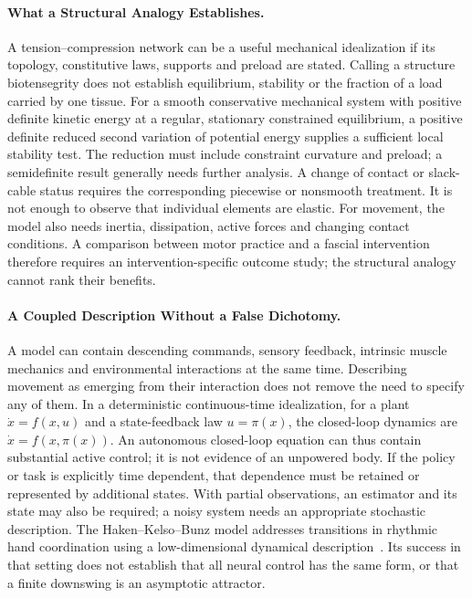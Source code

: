 
\paragraph{What a Structural Analogy Establishes.}
A tension--compression network can be a useful mechanical idealization if its topology, constitutive laws, supports and preload are stated.
Calling a structure biotensegrity does not establish equilibrium, stability or the fraction of a load carried by one tissue.
For a smooth conservative mechanical system with positive definite kinetic energy at a regular, stationary constrained equilibrium, a positive definite reduced second variation of potential energy supplies a sufficient local stability test.
The reduction must include constraint curvature and preload; a semidefinite result generally needs further analysis.
A change of contact or slack-cable status requires the corresponding piecewise or nonsmooth treatment.
It is not enough to observe that individual elements are elastic.
For movement, the model also needs inertia, dissipation, active forces and changing contact conditions.
A comparison between motor practice and a fascial intervention therefore requires an intervention-specific outcome study; the structural analogy cannot rank their benefits.


\paragraph{A Coupled Description Without a False Dichotomy.}
A model can contain descending commands, sensory feedback, intrinsic muscle mechanics and environmental interactions at the same time.
Describing movement as emerging from their interaction does not remove the need to specify any of them.
In a deterministic continuous-time idealization, for a plant $\dot x=f(x,u)$ and a state-feedback law $u=\pi(x)$, the closed-loop dynamics are $\dot x=f(x,\pi(x))$.
An autonomous closed-loop equation can thus contain substantial active control; it is not evidence of an unpowered body.
If the policy or task is explicitly time dependent, that dependence must be retained or represented by additional states.
With partial observations, an estimator and its state may also be required; a noisy system needs an appropriate stochastic description.
The Haken--Kelso--Bunz model addresses transitions in rhythmic hand coordination using a low-dimensional dynamical description~\cite{HakenKelsoBunz1985}.
Its success in that setting does not establish that all neural control has the same form, or that a finite downswing is an asymptotic attractor.


